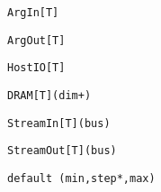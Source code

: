 \begin{table*}
\newsavebox{\argInSyntax}
\begin{lrbox}{\argInSyntax}
\begin{lstlisting}[language=SpatialTable]
ArgIn[T]
\end{lstlisting}
\end{lrbox}

\newsavebox{\argOutSyntax}
\begin{lrbox}{\argOutSyntax}
\begin{lstlisting}[language=SpatialTable]
ArgOut[T]
\end{lstlisting}
\end{lrbox}

\newsavebox{\hostIOSyntax}
\begin{lrbox}{\hostIOSyntax}
\begin{lstlisting}[language=SpatialTable]
HostIO[T]
\end{lstlisting}
\end{lrbox}

\newsavebox{\dramSyntax}
\begin{lrbox}{\dramSyntax}
\begin{lstlisting}[language=SpatialTable]
DRAM[T](dim+)
\end{lstlisting}
\end{lrbox}

\newsavebox{\streamInSyntax}
\begin{lrbox}{\streamInSyntax}
\begin{lstlisting}[language=SpatialTable]
StreamIn[T](bus)
\end{lstlisting}
\end{lrbox}

\newsavebox{\streamOutSyntax}
\begin{lrbox}{\streamOutSyntax}
\begin{lstlisting}[language=SpatialTable]
StreamOut[T](bus)
\end{lstlisting}
\end{lrbox}

\newsavebox{\parameterSyntax}
\begin{lrbox}{\parameterSyntax}
\begin{lstlisting}[language=SpatialTable]
default (min,step*,max)
\end{lstlisting}
\end{lrbox}


\end{table*}
